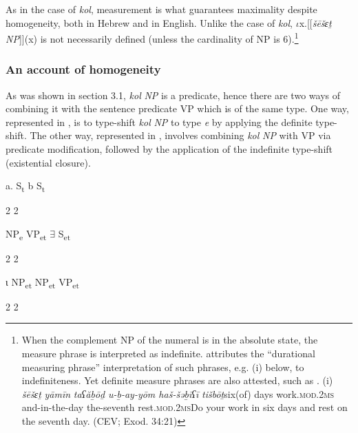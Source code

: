 \documentclass[output=paper]{langsci/langscibook}
\begin{document}
As in the case of \textit{kol}, measurement is what guarantees maximality despite homogeneity, both in Hebrew and in English. Unlike the case of \textit{kol}, ${\iota}$x.[[\textit{šēšɛṯ} \textit{NP}]](x) is not necessarily defined (unless the cardinality of NP is 6).\footnote{When the complement NP of the numeral is in the absolute state, the measure phrase is interpreted as indefinite. \citealt{MoshaviRothstein2018} attributes the “durational measuring phrase” interpretation of such phrases, e.g. (i) below, to indefiniteness. Yet definite measure phrases are also attested, such as . (i)  \textit{š}\textrm{\textit{ē}}\textit{š}\textrm{\textit{ɛṯ}     \textit{yāmīn} \textit{taʕăḇōḏ}              \textit{u-ḇ{}-ay-yōm      ha}}\textit{š}\textrm{\textit{{}-}}\textit{š}\textrm{\textit{əḇīʕī}     \textit{ti}}\textit{š}\textrm{\textit{bōṯ}}\textrm{six(of)  days   work.}\textrm{\textsc{mod.2ms} } \textrm{and-in-the-day  the-seventh  rest.}\textrm{\textsc{mod.2ms}}\textrm{Do your work in six days and rest on the seventh day. (CEV; Exod. 34:21)}}

\subsubsection{An account of homogeneity}%

As was shown in section 3.1, \textit{kol} \textit{NP} is a predicate, hence there are two ways of combining it with the sentence predicate VP which is of the same type. One way, represented in , is to type-shift \textit{kol} \textit{NP} to type \textit{e} by applying the definite type-shift. The other way, represented in , involves combining \textit{kol} \textit{NP} with VP via predicate modification, followed by the application of the indefinite type-shift (existential closure).  

\ea%
    \label{ex:doron:33}
         a.            S\textsubscript{t}                  b            S\textsubscript{t}

              2                2

        NP\textsubscript{e}          VP\textsubscript{et}           ${\exists}$            S\textsubscript{et}

             2                2

           ι              NP\textsubscript{et}          NP\textsubscript{et}     VP\textsubscript{et}

              2                 2
\end{document}
